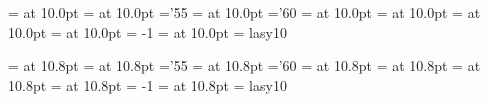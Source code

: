  \font\tenrm  = \textname at 10.0pt  	%
 \font\tenmi  = \mathitname at 10.0pt	%
    \skewchar\tenmi ='55		%
 \font\tensy  = \mathsyname at 10.0pt	%
    \skewchar\tensy ='60		%
 \font\tenit  = \italname at 10.0pt	%
 \font\tensl  = \slntname at 10.0pt	%
 \font\tenbf  = \boldname at 10.0pt	%
 \font\tentt  = \typename at 10.0pt	%
    \hyphenchar\tentt = -1      	%
 \font\tensf  = \sansname at 10.0pt	%
 \font\tenly  = lasy10			%

 \font\elvrm  = \textname at 10.8pt	%
 \font\elvmi  = \mathitname at 10.8pt	%
    \skewchar\elvmi ='55		%
 \font\elvsy  = \mathsyname at 10.8pt	%
    \skewchar\elvsy ='60        	%
 \font\elvit  = \italname at 10.8pt	%
 \font\elvsl  = \slntname at 10.8pt	%
 \font\elvbf  = \boldname at 10.8pt	%
 \font\elvtt  = \typename at 10.8pt	%
    \hyphenchar\elvtt = -1      	%
 \font\elvsf  = \sansname at 10.8pt	%
 \font\elvly  = lasy10  \@halfmag	%

